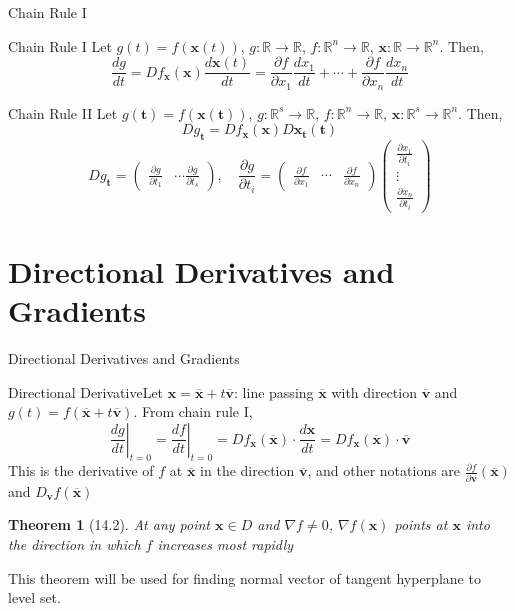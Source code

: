 \documentclass[a4paper,11pt]{article}
\newtheorem{thm}{Theorem}
\newcommand{\bb}{\mathbb}
\newcommand{\bd}{\mathbf}
\newcommand{\p}{\partial}
\begin{document}
\begin{frame}[t]{Chain Rule I}
	\begin{block}
		{Chain Rule I}
		Let $g(t)=f(\bd{x}(t))$, $g:\bb{R}\rightarrow\bb{R}$, $f:\bb{R}^n\rightarrow\bb{R}$, $\bd x :\bb{R}\rightarrow\bb{R}^n$. Then, \[
			\frac{d g}{dt} = Df_{\bd x}(\bd x) \frac {d\bd x(t)}{dt} = \frac{\p f}{\p x_1}\frac{dx_1}{dt}+ \cdots +\frac{\p f}{\p x_n}\frac{dx_n}{dt}
		\]
	\end{block}
	\begin{block}
		{Chain Rule II}
		Let $g(\bd t)=f(\bd{x}(\bd t))$, $g:\bb{R}^s\rightarrow\bb{R}$, $f:\bb{R}^n\rightarrow\bb{R}$, $\bd x :\bb{R}^s\rightarrow\bb{R}^n$. Then, \[
			Dg_{\bd t} = Df_{\bd x}(\bd x) D {\bd x_{\bd t}(\bd t)}
			\]\[
				Dg_{\bd t}=\begin{pmatrix}
					\frac{\p g}{\p t_1} & \cdots \frac{\p g}{\p t_s}
				\end{pmatrix},\quad\frac{\p g}{\p t_i} = \begin{pmatrix}
					\frac{\p f}{\p x_1} & \cdots & \frac{\p f}{\p x_n}
				\end{pmatrix}\begin{pmatrix}
					\frac{\p x_1 }{\p t_i}\\
					\vdots\\
					\frac{\p x_n }{\p t_i}
				\end{pmatrix}
			\]
	\end{block}
\end{frame}
\section{Directional Derivatives and Gradients} %
\label{sec:directional_derivatives_and_gradients}
\begin{frame}[t]{Directional Derivatives and Gradients}
	\begin{block}
		{Directional Derivative}Let $\bd x = \overline{\bd x} + t \overline{\bd v}$: line passing $\overline{\bd x}$ with direction $\overline{\bd v}$ and $g(t) = f(\overline{\bd x} + t \overline{\bd v})$. From chain rule I, \[
			\left.\frac{dg}{dt}\right\vert_{t=0} = \left.\frac{df}{dt}\right\vert_{t=0}= Df_{\bd x} (\overline{\bd x}) \cdot \frac{d\bd x}{dt} = Df_{\bd x} (\overline{\bd x})\cdot\overline{\bd v}
		\]This is the derivative of $f$ at $\overline{\bd x}$ in the direction $\overline{\bd v}$, and other notations are $\frac{\p f}{\p \bd v}(\overline{\bd x})$ and $D_{\bd v}f(\overline{\bd x})$
	\end{block}
	\begin{thm}
		[14.2] At any point $\bd x\in D$ and $\nabla f \neq 0$, $\nabla f(\bd x)$ points at $\bd x$ into the direction in which $f$ increases most rapidly
	\end{thm}
	This theorem will be used for finding normal vector of tangent hyperplane to level set.
\end{frame}
\end{document}
